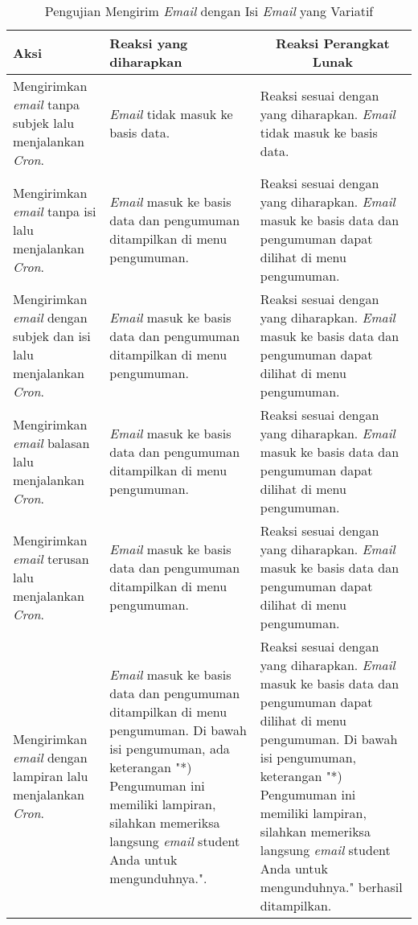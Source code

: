 \begin{itemize}
      \begin{longtable}{|p{5cm}|p{5cm}|p{5cm}|}
        \caption{Pengujian Mengirim \textit{Email} dengan Isi \textit{Email} yang Variatif}
        \label{table:pengujian-fungsional-isi-variatif}\\
        \hline
        \centering Aksi	& 	\centering Reaksi yang diharapkan &  \multicolumn{1}{c|}{Reaksi Perangkat Lunak} \\
        \hline
        Mengirimkan \textit{email} tanpa subjek lalu menjalankan \textit{Cron}. & \textit{Email} tidak masuk ke basis data. & Reaksi sesuai dengan yang diharapkan. \textit{Email} tidak masuk ke basis data. \\
        \hline
        Mengirimkan \textit{email} tanpa isi lalu menjalankan \textit{Cron}. & \textit{Email} masuk ke basis data dan pengumuman ditampilkan di menu pengumuman. & Reaksi sesuai dengan yang diharapkan. \textit{Email} masuk ke basis data dan pengumuman dapat dilihat di menu pengumuman. \\
        \hline
        Mengirimkan \textit{email} dengan subjek dan isi lalu menjalankan \textit{Cron}. & \textit{Email} masuk ke basis data dan pengumuman ditampilkan di menu pengumuman. & Reaksi sesuai dengan yang diharapkan. \textit{Email} masuk ke basis data dan pengumuman dapat dilihat di menu pengumuman. \\
        \hline
        Mengirimkan \textit{email} balasan lalu menjalankan \textit{Cron}. & \textit{Email} masuk ke basis data dan pengumuman ditampilkan di menu pengumuman. & Reaksi sesuai dengan yang diharapkan. \textit{Email} masuk ke basis data dan pengumuman dapat dilihat di menu pengumuman. \\
        \hline
        Mengirimkan \textit{email} terusan lalu menjalankan \textit{Cron}. & \textit{Email} masuk ke basis data dan pengumuman ditampilkan di menu pengumuman. & Reaksi sesuai dengan yang diharapkan. \textit{Email} masuk ke basis data dan pengumuman dapat dilihat di menu pengumuman. \\
        \hline
        Mengirimkan \textit{email} dengan lampiran lalu menjalankan \textit{Cron}. & \textit{Email} masuk ke basis data dan pengumuman ditampilkan di menu pengumuman. Di bawah isi pengumuman, ada keterangan "*) Pengumuman ini memiliki lampiran, silahkan memeriksa langsung \textit{email} student Anda untuk mengunduhnya.". & Reaksi sesuai dengan yang diharapkan. \textit{Email} masuk ke basis data dan pengumuman dapat dilihat di menu pengumuman. Di bawah isi pengumuman, keterangan "*) Pengumuman ini memiliki lampiran, silahkan memeriksa langsung \textit{email} student Anda untuk mengunduhnya." berhasil ditampilkan. \\

\end{longtable}
\end{itemize}
